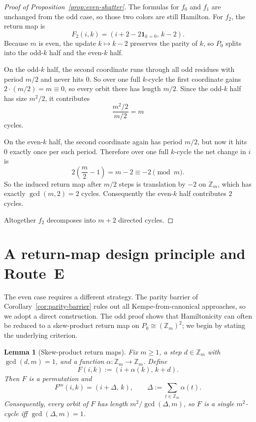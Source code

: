 \documentclass[11pt]{article}
\newtheorem{lemma}{Lemma}
\begin{document}
\begin{proof}[Proof of Proposition~\ref{prop:even-shatter}]
The formulas for $f_0$ and $f_1$ are unchanged from the odd case, so those two colors are still Hamilton.
For $f_2$, the return map is
\[
F_2(i,k)=(i+2-2\mathbf 1_{k=0},\,k-2).
\]
Because $m$ is even, the update $k\mapsto k-2$ preserves the parity of $k$, so $P_0$ splits into the odd-$k$ half and the even-$k$ half.

On the odd-$k$ half, the second coordinate runs through all odd residues with period $m/2$ and never hits $0$.
So over one full $k$-cycle the first coordinate gains $2\cdot(m/2)=m\equiv 0$, so every orbit there has length $m/2$.
Since the odd-$k$ half has size $m^2/2$, it contributes
\[
\frac{m^2/2}{m/2}=m
\]
cycles.

On the even-$k$ half, the second coordinate again has period $m/2$, but now it hits $0$ exactly once per such period.
Therefore over one full $k$-cycle the net change in $i$ is
\[
2\left(\frac m2-1\right)=m-2\equiv -2 \pmod m.
\]
So the induced return map after $m/2$ steps is translation by $-2$ on $\mathbb Z_m$, which has exactly $\gcd(m,2)=2$ cycles.
Consequently the even-$k$ half contributes $2$ cycles.

Altogether $f_2$ decomposes into $m+2$ directed cycles.
\end{proof}


\section{A return-map design principle and Route~E}\label{sec:even}

The even case requires a different strategy.
The parity barrier of Corollary~\ref{cor:parity-barrier} rules out all Kempe-from-canonical approaches, so we adopt a direct construction.
The odd proof shows that Hamiltonicity can often be reduced to a skew-product return map on $P_0\cong (\mathbb Z_m)^2$; we begin by stating the underlying criterion.

\begin{lemma}[Skew-product return maps]\label{lem:skew-product}
Fix $m\ge 1$, a step $d\in \mathbb Z_m$ with $\gcd(d,m)=1$, and a function $\alpha:\mathbb Z_m\to\mathbb Z_m$.
Define
\[
F(i,k):=(i+\alpha(k),\,k+d).
\]
Then $F$ is a permutation and
\[
F^m(i,k)=(i+\Delta,\,k),\qquad \Delta:=\sum_{t\in\mathbb Z_m}\alpha(t).
\]
Consequently, every orbit of $F$ has length $m^2/\gcd(\Delta,m)$, so $F$ is a single $m^2$-cycle iff $\gcd(\Delta,m)=1$.
\end{lemma}
\end{document}
